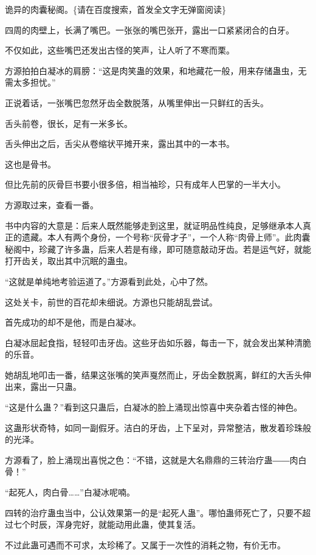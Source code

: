 
\begin{this_body}

诡异的肉囊秘阁。\{请在百度搜索，首发全文字无弹窗阅读\}

四周的肉壁上，长满了嘴巴。一张张的嘴巴张开，露出一口紧紧闭合的白牙。

不仅如此，这些嘴巴还发出古怪的笑声，让人听了不寒而栗。

方源拍拍白凝冰的肩膀：“这是肉笑蛊的效果，和地藏花一般，用来存储蛊虫，无需太多担忧。”

正说着话，一张嘴巴忽然牙齿全数脱落，从嘴里伸出一只鲜红的舌头。

舌头前卷，很长，足有一米多长。

舌头伸出之后，舌尖从卷缩状平摊开来，露出其中的一本书。

这也是骨书。

但比先前的灰骨巨书要小很多倍，相当袖珍，只有成年人巴掌的一半大小。

方源取过来，查看一番。

书中内容的大意是：后来人既然能够走到这里，就证明品性纯良，足够继承本人真正的遗藏。本人有两个身份，一个号称“灰骨才子”，一个人称“肉骨上师”。此肉囊秘阁中，珍藏了许多蛊，后来人若是有缘，即可随意敲动牙齿。若是运气好，就能打开齿关，取出其中沉眠的蛊虫。

“这就是单纯地考验运道了。”方源看到此处，心中了然。

这处关卡，前世的百花却未细说。方源也只能胡乱尝试。

首先成功的却不是他，而是白凝冰。

白凝冰屈起食指，轻轻叩击牙齿。这些牙齿如乐器，每击一下，就会发出某种清脆的乐音。

她胡乱地叩击一番，结果这张嘴的笑声戛然而止，牙齿全数脱离，鲜红的大舌头伸出来，露出一只蛊。

“这是什么蛊？”看到这只蛊后，白凝冰的脸上涌现出惊喜中夹杂着古怪的神色。

这蛊形状奇特，如同一副假牙。洁白的牙齿，上下呈对，异常整洁，散发着珍珠般的光泽。

方源看了，脸上涌现出喜悦之色：“不错，这就是大名鼎鼎的三转治疗蛊――肉白骨！”

“起死人，肉白骨……”白凝冰呢喃。

四转的治疗蛊虫当中，公认效果第一的是“起死人蛊”。哪怕蛊师死亡了，只要不超过七个时辰，浑身完好，就能动用此蛊，使其复活。

不过此蛊可遇而不可求，太珍稀了。又属于一次性的消耗之物，有价无市。


\end{this_body}
